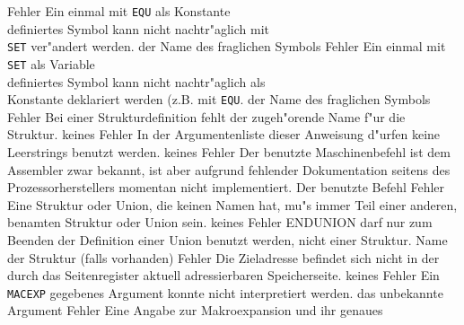\documentclass[12pt,a4paper,twoside]{report}
\newcommand{\tty}[1]{{\tt #1}}
\begin{document}
{\begin{description}
               {Fehler}
               {Ein einmal mit {\tt EQU} als Konstante\\
                definiertes Symbol kann nicht nachtr"aglich mit\\
                {\tt SET} ver"andert werden.}
               {der Name des fraglichen Symbols}
               {Fehler}
               {Ein einmal mit {\tt SET} als Variable\\
                definiertes Symbol kann nicht nachtr"aglich als\\
                Konstante deklariert werden (z.B. mit {\tt EQU}.}
               {der Name des fraglichen Symbols}
               {Fehler}
               {Bei einer Strukturdefinition fehlt der zugeh"orende
                Name f"ur die Struktur.}
               {keines}
               {Fehler}
               {In der Argumentenliste dieser Anweisung d"urfen keine
                Leerstrings benutzt werden.}
               {keines}
               {Fehler}
               {Der benutzte Maschinenbefehl ist dem Assembler
                zwar bekannt, ist aber aufgrund fehlender
                Dokumentation seitens des Prozessorherstellers
                momentan nicht implementiert.}
               {Der benutzte Befehl}
               {Fehler}
               {Eine Struktur oder Union, die keinen Namen hat, mu"s
                immer Teil einer anderen, benamten Struktur oder Union
                sein.}
               {keines}
               {Fehler}
               {ENDUNION darf nur zum Beenden der Definition einer
                Union benutzt werden, nicht einer Struktur.}
               {Name der Struktur (falls vorhanden)}
               {Fehler}
               {Die Zieladresse befindet sich nicht in der durch 
                das Seitenregister aktuell adressierbaren
                Speicherseite.}
               {keines}
               {Fehler}
               {Ein \tty{MACEXP} gegebenes Argument konnte nicht
                interpretiert werden.}
               {das unbekannte Argument}
               {Fehler}
               {Eine Angabe zur Makroexpansion und ihr genaues
}
\end{description}}
\end{document}

